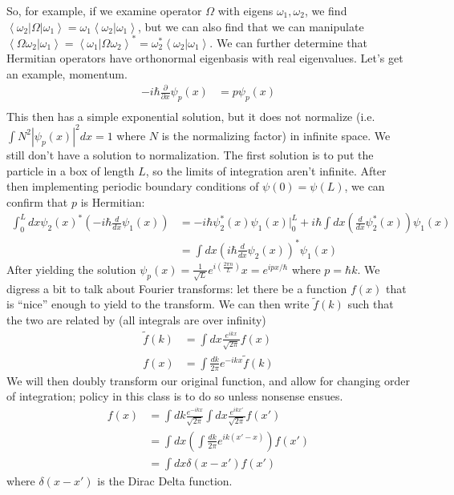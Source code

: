 \documentclass[10pt]{report}
\newcommand{\bra}[1]{\left<#1\right|}
\newcommand{\ket}[1]{\left|#1\right>}
\newcommand{\dotp}[2]{\left<#1\left.\right|#2\right>}
\newcommand{\rd}[2]{\frac{d#1}{d#2}}
\newcommand{\pd}[2]{\frac{\partial #1}{\partial#2}}
\newcommand{\abs}[1]{\left|#1\right|}
\begin{document}
So, for example, if we examine operator $\Omega$ with eigens $\omega_1,\omega_2$, we find $\bra{\omega_2}\Omega\ket{\omega_1} = \omega_1\dotp{\omega_2}{\omega_1}$, but we can also find that we can manipulate $\dotp{\Omega\omega_2}{\omega_1} = \dotp{\omega_1}{\Omega\omega_2}^* = \omega_2^*\dotp{\omega_2}{\omega_1}$. We can further determine that Hermitian operators have orthonormal eigenbasis with real eigenvalues. Let's get an example, momentum. 
\begin{align}
	-i\hbar \pd{}{x}\psi_p(x) &= p\psi_p(x)\\
\end{align}
This then has a simple exponential solution, but it does not normalize (i.e. $\int N^2\abs{\psi_p(x)}^2 dx = 1$ where $N$ is the normalizing factor) in infinite space. We still don't have a solution to normalization. The first solution is to put the particle in a box of length $L$, so the limits of integration aren't infinite. After then implementing periodic boundary conditions of $\psi(0) = \psi(L)$, we can confirm that $p$ is Hermitian:
\begin{align}
	\int_0^L dx \psi_2(x)^*\left( -i\hbar \rd{}{x}\psi_1(x) \right) &= -i\hbar \psi_2^*(x)\psi_1(x)|_0^L + i\hbar\int dx \left( \rd{}{x}\psi_2^*(x) \right)\psi_1(x)\\
	&= \int dx \left( i\hbar \rd{}{x} \psi_2(x)\right)^*\psi_1(x)
\end{align}
After yielding the solution $\psi_p(x) = \frac{1}{\sqrt{L}}e^{i\left( \frac{2\pi n}{L}\right)} x = e^{ipx/\hbar}$ where $p=\hbar k$. We digress a bit to talk about Fourier transforms: let there be a function $f(x)$ that is ``nice'' enough to yield to the transform. We can then write $\tilde{f}(k)$ such that the two are related by (all integrals are over infinity)
\begin{align}
	\tilde{f}(k) &= \int dx \frac{e^{ikx}}{\sqrt{2\pi}}f(x)\\
	f(x) &= \int \frac{dk}{2\pi}e^{-ikx}\tilde{f}(k)
\end{align}
We will then doubly transform our original function, and allow for changing order of integration; policy in this class is to do so unless nonsense ensues.
\begin{align}
	f(x)&=\int dk \frac{e^{-ikx}}{\sqrt{2\pi}}\int dx \frac{e^{ikx'}}{\sqrt{2\pi}}f(x')\\
	&= \int dx \left( \int \frac{dk}{2\pi}e^{ik(x'-x)} \right)f(x')\\
	&= \int dx \delta(x-x') f(x')
\end{align}
where $\delta(x-x')$ is the Dirac Delta function. 
\end{document}
